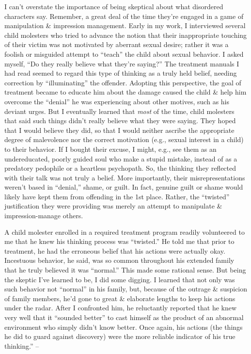 \documentclass{article}
\numberwithin{equation}{section}
\begin{document}
I can't overstate the importance of being skeptical about what disordered characters say. Remember, a great deal of the time they're engaged in a game of manipulation \& impression management. Early in my work, I interviewed several child molesters who tried to advance the notion that their inappropriate touching of their victim was not motivated by aberrant sexual desire; rather it was a foolish or misguided attempt to ``teach'' the child about sexual behavior. I asked myself, ``Do they really believe what they're saying?'' The treatment manuals I had read seemed to regard this type of thinking as a truly held belief, needing correction by ``illuminating'' the offender. Adopting this perspective, the goal of treatment became to educate him about the damage caused the child \& help him overcome the ``denial'' he was experiencing about other motives, such as his deviant urges. But I eventually learned that \textit{most} of the time, child molesters that said such things didn't really believe what they were saying. They hoped that I would believe they did, so that I would neither ascribe the appropriate degree of malevolence nor the correct motivation (e.g., sexual interest in a child) to their behavior. If I bought their excuse, I might, e.g., see them as an undereducated, poorly guided soul who make a stupid mistake, instead of as a predatory pedophile or a heartless psychopath. So, the thinking they reflected with their talk was not truly a belief. More importantly, their misrepresentations weren't based in ``denial,'' shame, or guilt. In fact, genuine guilt or shame would likely have kept them from offending in the 1st place. Rather, the ``twisted'' justification they were providing was merely an attempt to manipulate \& impression-manage others.

A child molester enrolled in a required treatment program readily volunteered to me that he knew his thinking process was ``twisted.'' He told me that prior to treatment, he had the erroneous belief that his actions were actually okay. Incestuous behavior, he said, was so common throughout his extended family that he truly believed it was ``normal.'' This made some rational sense. But being the skeptic I've learned to be, I did some digging. I learned that not only was such behavior not ``normal'' in his family, but, because of the outrage \& suspicion of family members, he'd gone to great \& elaborate lengths to keep his actions under the radar. After I confronted him, he reluctantly reported that he knew very well that it ``sounded better'' to cast himself as the product of an abnormal environment who simply didn't know better. Once again, his actions (the things he did to guard against discovery) were the more reliable indicator of his true thinking.'' -- \cite[pp. 147--150]{Simon2011}
\end{document}
